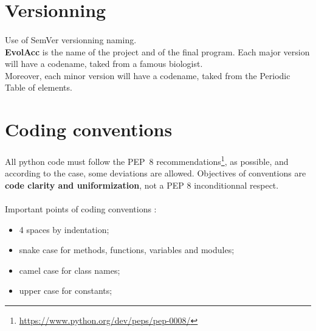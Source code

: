 \documentclass{report} %
\begin{document}
    

\section*{Versionning}
    \paragraph*{}
    Use of SemVer versionning naming.\\
    \textbf{EvolAcc} is the name of the project and of the final program.
    Each major version will have a codename, taked from a famous biologist.\\
    Moreover, each minor version will have a codename, 
    taked from the Periodic Table of elements.
    



\section*{Coding conventions}
    \paragraph*{}
    All python code must follow the PEP 8 recommendations\footnote{\url{https://www.python.org/dev/peps/pep-0008/}}, 
    as possible, and according to the case, some deviations are allowed.
    Objectives of conventions are \textbf{code clarity and uniformization}, not a PEP 8 inconditionnal respect. 
    \paragraph*{}
    Important points of coding conventions :
    \begin{itemize}
        \item 4 spaces by indentation;
        \item snake case for methods, functions, variables and modules;
        \item camel case for class names;
        \item upper case for constants;
    \end{itemize}
    



\end{document}
